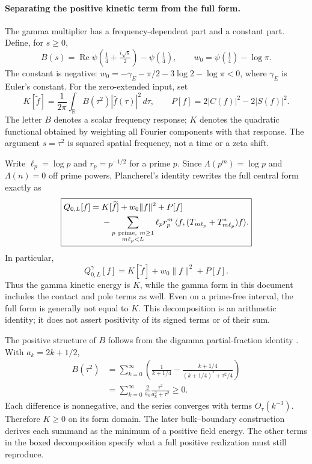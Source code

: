 \paragraph{Separating the positive kinetic term from the full form.}
The gamma multiplier has a frequency-dependent part and a constant part.
Define, for $s\geq0$,
\[
B(s)=\operatorname{Re}\psi\!\left(\tfrac14+\tfrac{i\sqrt{s}}2\right)
-\psi(\tfrac14),\qquad w_0=\psi(\tfrac14)-\log\pi.
\]
The constant is negative:
$w_0=-\gamma_E-\pi/2-3\log2-\log\pi<0$, where $\gamma_E$ is Euler's
constant. For the zero-extended input, set
\[
K[\widetilde f]
=\frac1{2\pi}\int_{\mathbb R}B(\tau^2)|\widehat f(\tau)|^2\,d\tau,
\qquad P[f]=2|C(f)|^2-2|S(f)|^2.
\]
The letter $B$ denotes a scalar frequency response; $K$ denotes the
quadratic functional obtained by weighting all Fourier components with
that response. The argument $s=\tau^2$ is squared spatial frequency,
not a time or a zeta shift.

Write $\ell_p=\log p$ and $r_p=p^{-1/2}$ for a prime $p$.
Since $\Lambda(p^m)=\log p$ and $\Lambda(n)=0$ off prime powers,
Plancherel's identity rewrites the full central form exactly as
\[
\boxed{\begin{aligned}
Q_{0,L}[f]={}&K[\widetilde f]+w_0\lVert f\rVert^2+P[f]\\
&-\sum_{\substack{p\ {\rm prime},\ m\geq1\\m\ell_p<L}}
\ell_pr_p^m\,
\langle f,(T_{m\ell_p}+T_{m\ell_p}^*)f\rangle .
\end{aligned}}
\]
In particular,
\[
Q^\gamma_{0,L}[f]=K[\widetilde f]+w_0\lVert f\rVert^2+P[f].
\]
Thus the gamma kinetic energy is $K$, while the gamma form in this
document includes the contact and pole terms as well. Even on a
prime-free interval, the full form is generally not equal to $K$.
This decomposition is an arithmetic identity; it does not assert
positivity of its signed terms or of their sum.

The positive structure of $B$ follows from the digamma partial-fraction
identity \cite[\S5.7]{DLMF}. With $a_k=2k+1/2$,
\[
\begin{aligned}
B(\tau^2)
&=\sum_{k=0}^\infty
\left(\frac{1}{k+1/4}
-\frac{k+1/4}{(k+1/4)^2+\tau^2/4}\right)\\
&=\sum_{k=0}^\infty\frac{2}{a_k}
\frac{\tau^2}{a_k^2+\tau^2}\geq0.
\end{aligned}
\]
Each difference is nonnegative, and the series converges with terms
$O_\tau(k^{-3})$. Therefore $K\geq0$ on its form domain. The later
bulk--boundary construction derives each summand as the minimum of a
positive field energy. The other terms in the boxed decomposition
specify what a full positive realization must still reproduce.

